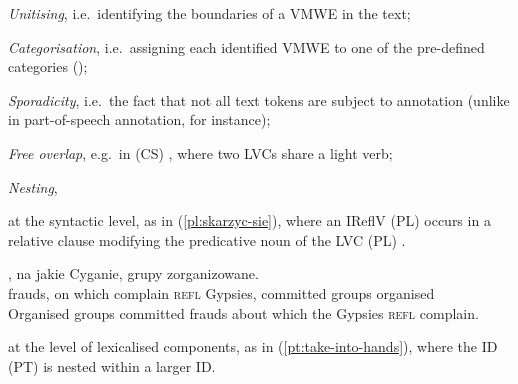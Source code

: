 \documentclass[output=paper,
modfonts,
]{langscibook}
\begin{document}
\begin{sitem}
\item \emph{Unitising}, i.e.\ identifying the boundaries of a VMWE in the text;
\item \emph{Categorisation}, i.e.\ assigning each identified VMWE to one of the pre-de\-fined categories ();%
\item \emph{Sporadicity}, i.e.\ the fact that not all text tokens are subject to annotation (unlike in part-of-speech annotation, for instance);
\item \emph{Free overlap}, e.g.\ in (CS) , where two LVCs share a light verb;

\item \emph{Nesting}, 
    \begin{sitem}
    \item at the syntactic level, as in (\ref{pl:skarzyc-sie}), where an IReflV (PL)  occurs in a relative clause modifying the predicative noun of the LVC (PL) .

\ea \label{pl:skarzyc-sie}
\settowidth {}
\gll {}, na jakie   Cyganie,  grupy zorganizowane. \\
frauds, on which complain \textsc{refl} Gypsies, committed groups organised\\ 
\glt Organised groups committed frauds about which the Gypsies \textsc{refl} complain. 
\z

	\item at the level of lexicalised components, as in (\ref{pt:take-into-hands}), where the ID (PT)  is nested within a larger ID.
    


\end{sitem}
\end{sitem}
\end{document}
